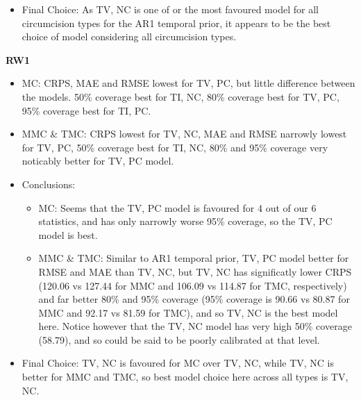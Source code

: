 \documentclass{article}
\begin{document}
\begin{itemize}
\begin{itemize}
    \end{itemize}
    \item Final Choice: As TV, NC is one of or the most favoured model for all circumcision types for the AR1 temporal prior, it appears to be the best choice of model considering all circumcision types. 
\end{itemize}

\vspace{\bigskipamount}

\textbf{RW1}

\begin{itemize}
    \item MC: CRPS, MAE and RMSE lowest for TV, PC, but little difference between the models.  50\% coverage best for TI, NC, 80\% coverage best for TV, PC, 95\% coverage best for TI, PC.
    \item MMC \& TMC: 
    CRPS lowest for TV, NC, MAE and RMSE narrowly lowest for TV, PC, 50\% coverage best for TI, NC, 80\% and 95\% coverage very noticably better for TV, PC model.
    \item Conclusions:
    \begin{itemize}
        \item MC: Seems that the TV, PC model is favoured for 4 out of our 6 statistics, and has only narrowly worse 95\% coverage, so the TV, PC model is best. 
        \item MMC \& TMC: Similar to AR1 temporal prior, TV, PC model better for RMSE and MAE than TV, NC, but TV, NC has significatly lower CRPS (120.06 vs 127.44 for MMC and 106.09 vs 114.87 for TMC, respectively) and far better 80\% and 95\% coverage (95\% coverage is 90.66 vs 80.87 for MMC and 92.17 vs 81.59 for TMC), and so TV, NC is the best model here. Notice however that the TV, NC model has very high 50\% coverage (58.79), and so could be said to be poorly calibrated at that level. 
    \end{itemize}
    \item Final Choice: TV, NC is favoured for MC over TV, NC, while TV, NC is better for MMC and TMC, so best model choice here across all types is TV, NC. 
\end{itemize}

\vspace{\bigskipamount}
  
\end{document}
